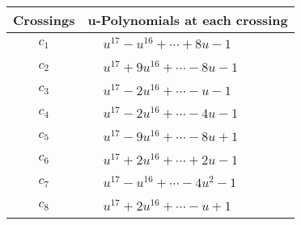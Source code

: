 \documentclass[1p]{elsarticle_modified}
\theoremstyle{definition}
\begin{document}
\begin{tabular}{m{50pt}|m{274pt}}
Crossings & \hspace{64pt}u-Polynomials at each crossing \\
\hline $$\begin{aligned}c_{1}\end{aligned}$$&$\begin{aligned}
&u^{17}- u^{16}+\cdots+8 u-1
\end{aligned}$\\
\hline $$\begin{aligned}c_{2}\end{aligned}$$&$\begin{aligned}
&u^{17}+9 u^{16}+\cdots-8 u-1
\end{aligned}$\\
\hline $$\begin{aligned}c_{3}\end{aligned}$$&$\begin{aligned}
&u^{17}-2 u^{16}+\cdots- u-1
\end{aligned}$\\
\hline $$\begin{aligned}c_{4}\end{aligned}$$&$\begin{aligned}
&u^{17}-2 u^{16}+\cdots-4 u-1
\end{aligned}$\\
\hline $$\begin{aligned}c_{5}\end{aligned}$$&$\begin{aligned}
&u^{17}-9 u^{16}+\cdots-8 u+1
\end{aligned}$\\
\hline $$\begin{aligned}c_{6}\end{aligned}$$&$\begin{aligned}
&u^{17}+2 u^{16}+\cdots+2 u-1
\end{aligned}$\\
\hline $$\begin{aligned}c_{7}\end{aligned}$$&$\begin{aligned}
&u^{17}- u^{16}+\cdots-4 u^2-1
\end{aligned}$\\
\hline $$\begin{aligned}c_{8}\end{aligned}$$&$\begin{aligned}
&u^{17}+2 u^{16}+\cdots- u+1
\end{aligned}$\\

\end{tabular}
\end{document}
